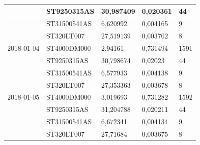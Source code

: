 \documentclass{VUMIFPSkursinis}
\begin{document}
\begin{table}[H]
{\begin{tabular}{|l|l|l|l|l|}
\cellcolor[HTML]{C0C0C0}            & ST9250315AS                           & 30,987409                              & 0,020361                             & 44                                   \\ \hline
\cellcolor[HTML]{C0C0C0}            & ST31500541AS                          & 6,620992                               & 0,004165                             & 9                                    \\ \hline
\cellcolor[HTML]{C0C0C0}            & ST320LT007                            & 27,519139                              & 0,003702                             & 8                                    \\ \hline
2018-01-04                          & ST4000DM000                           & 2,94161                                & 0,731494                             & 1591                                 \\ \hline
\cellcolor[HTML]{C0C0C0}            & ST9250315AS                           & 30,798674                              & 0,02023                              & 44                                   \\ \hline
\cellcolor[HTML]{C0C0C0}            & ST31500541AS                          & 6,577933                               & 0,004138                             & 9                                    \\ \hline
\cellcolor[HTML]{C0C0C0}            & ST320LT007                            & 27,353363                              & 0,003678                             & 8                                    \\ \hline
2018-01-05                          & ST4000DM000                           & 3,019693                               & 0,731282                             & 1592                                 \\ \hline
\cellcolor[HTML]{C0C0C0}            & ST9250315AS                           & 31,204788                              & 0,020211                             & 44                                   \\ \hline
\cellcolor[HTML]{C0C0C0}            & ST31500541AS                          & 6,672341                               & 0,004134                             & 9                                    \\ \hline
\cellcolor[HTML]{C0C0C0}            & ST320LT007                            & 27,71684                               & 0,003675                             & 8                                    \\ \hline

\end{tabular}}
\end{table}
\end{document}
